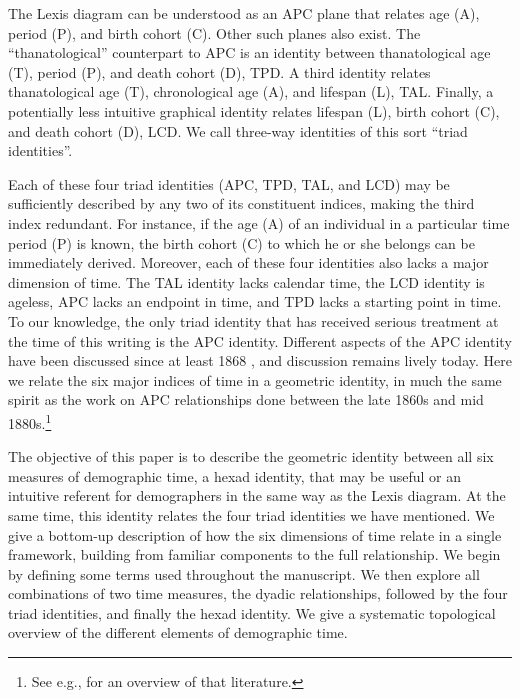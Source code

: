 \documentclass[11pt,oneside,a4paper]{article} %
\begin{document}
The Lexis diagram can be understood as an APC plane
that relates age (A), period (P), and birth cohort (C). Other such planes also
exist. The ``thanatological'' counterpart to APC is an identity between
thanatological age (T), period (P), and death cohort (D), TPD. A third identity
relates thanatological age (T), chronological age (A), and lifespan (L), TAL. Finally, a potentially less
intuitive graphical identity relates lifespan (L), birth cohort (C), and death
cohort (D), LCD. We call three-way identities of this sort ``triad identities''.

Each of these four triad identities (APC, TPD, TAL, and LCD) may be sufficiently described by any two of its constituent indices, making the third index redundant. For instance, if the age (A) of an individual in a particular time period (P) is known, the birth cohort (C) to which he or she belongs can be immediately derived. Moreover, each of these four identities also lacks a major dimension of time. The TAL identity lacks calendar time, the LCD identity is ageless, APC lacks an endpoint in time, and TPD lacks a starting point in time.
To our knowledge, the only triad identity that has received serious
treatment at the time of this writing is the APC identity. Different
aspects of the APC identity have been discussed since at least 1868
\citep{knapp1868ermittlung}, and discussion remains lively today. Here we relate the six major indices of time in a geometric identity, in much the same spirit as the work on APC relationships done between the late
1860s and mid 1880s.\footnote{See e.g., \citet{keiding2011age} for an overview of that literature.} 

The objective of this paper is to describe the geometric identity between all
six measures of demographic time, a hexad identity, that may be useful or an intuitive
referent for demographers in the same way as the Lexis diagram. At the same time, this identity relates the
four triad identities we have mentioned. We give a bottom-up
description of how the six dimensions of time relate in a single framework,
building from familiar components to the full relationship.
We begin by defining some terms used throughout the manuscript. We then explore all combinations of two time
measures, the dyadic relationships, followed by the four triad identities, and
finally the hexad identity. We give a systematic topological overview of the
different elements of demographic time. 
\end{document}
